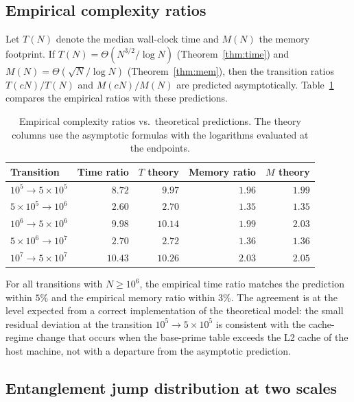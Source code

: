 \documentclass[11pt]{amsart}
\numberwithin{equation}{section}
\theoremstyle{plain}
\theoremstyle{definition}
\begin{document}
\subsection{Empirical complexity ratios}
\label{subsec:ratios}

Let $T(N)$ denote the median wall-clock time and $M(N)$ the memory
footprint. If $T(N)=\Theta(N^{3/2}/\log N)$
(Theorem~\ref{thm:time}) and $M(N)=\Theta(\sqrt{N}/\log N)$
(Theorem~\ref{thm:mem}), then the transition ratios $T(cN)/T(N)$ and
$M(cN)/M(N)$ are predicted asymptotically. Table~\ref{tab:ratios}
compares the empirical ratios with these predictions.

\begin{table}[htbp]
\centering
\small
\caption{Empirical complexity ratios vs.\ theoretical predictions.
The theory columns use the asymptotic formulas with the logarithms
evaluated at the endpoints.}
\label{tab:ratios}
\begin{tabular}{lrrrr}
\toprule
Transition & Time ratio & $T$ theory & Memory ratio & $M$ theory \\
\midrule
$10^5\to 5\times 10^5$ & $8.72$ & $9.97$ & $1.96$ & $1.99$ \\
$5\times 10^5\to 10^6$ & $2.60$ & $2.70$ & $1.35$ & $1.35$ \\
$10^6\to 5\times 10^6$ & $9.98$ & $10.14$ & $1.99$ & $2.03$ \\
$5\times 10^6\to 10^7$ & $2.70$ & $2.72$ & $1.36$ & $1.36$ \\
$10^7\to 5\times 10^7$ & $10.43$ & $10.26$ & $2.03$ & $2.05$ \\
\bottomrule
\end{tabular}
\end{table}

For all transitions with $N\ge 10^6$, the empirical time ratio matches
the prediction within $5\%$ and the empirical memory ratio within
$3\%$. The agreement is at the level expected from a correct
implementation of the theoretical model: the small residual deviation
at the transition $10^5\to 5\times 10^5$ is consistent with the
cache-regime change that occurs when the base-prime table exceeds the
L2 cache of the host machine, not with a departure from the
asymptotic prediction.

\subsection{Entanglement jump distribution at two scales}
\label{subsec:delta-k-distribution}
\end{document}
